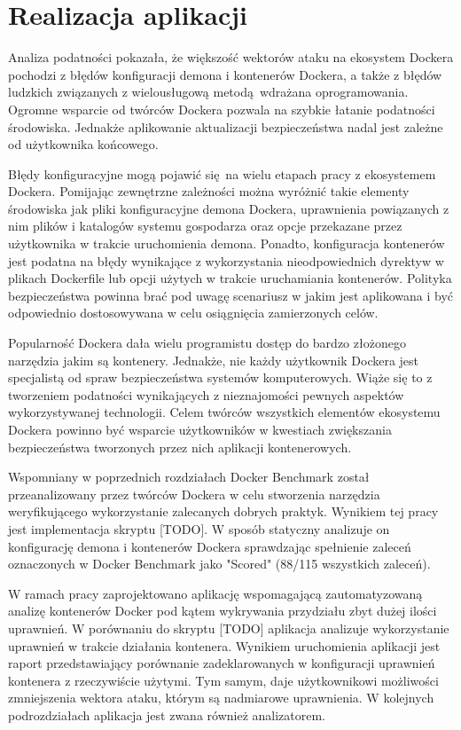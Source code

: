 \chapter{Realizacja aplikacji}

Analiza podatności pokazała, że większość wektorów ataku na ekosystem Dockera pochodzi z błędów konfiguracji demona i kontenerów Dockera, a także z błędów ludzkich związanych z wielousługową metodą wdrażana oprogramowania. Ogromne wsparcie od twórców Dockera pozwala na szybkie łatanie podatności środowiska. Jednakże aplikowanie aktualizacji bezpieczeństwa nadal jest zależne od użytkownika końcowego.

Błędy konfiguracyjne mogą pojawić się na wielu etapach pracy z ekosystemem Dockera. Pomijając zewnętrzne zależności można wyróżnić takie elementy środowiska jak pliki konfiguracyjne demona Dockera, uprawnienia powiązanych z nim plików i katalogów systemu gospodarza oraz opcje przekazane przez użytkownika w trakcie uruchomienia demona. Ponadto, konfiguracja kontenerów jest podatna na błędy wynikające z wykorzystania nieodpowiednich dyrektyw w plikach Dockerfile lub opcji użytych w trakcie uruchamiania kontenerów. Polityka bezpieczeństwa powinna brać pod uwagę scenariusz w jakim jest aplikowana i być odpowiednio dostosowywana w celu osiągnięcia zamierzonych celów.

Popularność Dockera dała wielu programistu dostęp do bardzo złożonego narzędzia jakim są kontenery. Jednakże, nie każdy użytkownik Dockera jest specjalistą od spraw bezpieczeństwa systemów komputerowych. Wiąże się to z tworzeniem podatności wynikających z nieznajomości pewnych aspektów wykorzystywanej technologii. Celem twórców wszystkich elementów ekosystemu Dockera powinno być wsparcie użytkowników w kwestiach zwiększania bezpieczeństwa tworzonych przez nich aplikacji kontenerowych. 

Wspomniany w poprzednich rozdziałach Docker Benchmark \cite{CISDockerBenchmark} został przeanalizowany przez twórców Dockera w celu stworzenia narzędzia weryfikującego wykorzystanie zalecanych dobrych praktyk. Wynikiem tej pracy jest implementacja skryptu [TODO]. W sposób statyczny analizuje on konfigurację demona i kontenerów Dockera sprawdzając spełnienie zaleceń oznaczonych w Docker Benchmark jako "Scored" (88/115 wszystkich zaleceń).

W ramach pracy zaprojektowano aplikację wspomagającą zautomatyzowaną analizę kontenerów Docker pod kątem wykrywania przydziału zbyt dużej ilości uprawnień. W porównaniu do skryptu [TODO] aplikacja analizuje wykorzystanie uprawnień w trakcie działania kontenera. Wynikiem uruchomienia aplikacji jest raport przedstawiający porównanie zadeklarowanych w konfiguracji uprawnień kontenera z rzeczywiście użytymi. Tym samym, daje użytkownikowi możliwości zmniejszenia wektora ataku, którym są nadmiarowe uprawnienia. W kolejnych podrozdziałach aplikacja jest zwana również analizatorem.

